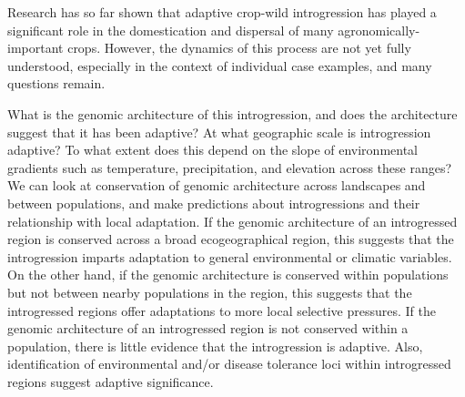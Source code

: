 \documentclass[11pt]{article}
\newcommand{\gmj}[1]{\textcolor{blue}{ \emph{\scriptsize  #1}} } %
\begin{document}


Research has so far shown that adaptive crop-wild introgression has played a significant role in the domestication and dispersal of many agronomically-important crops.
However, the dynamics of this process are not yet fully understood, especially in the context of individual case examples, and many questions remain.

What is the genomic architecture of this introgression, and does the architecture suggest that it has been adaptive?
At what geographic scale is introgression adaptive?
To what extent does this depend on the slope of environmental gradients such as temperature, precipitation, and elevation across these ranges?
We can look at conservation of genomic architecture across landscapes and between populations, and make predictions about introgressions and their relationship with local adaptation.
If the genomic architecture of an introgressed region is conserved across a broad ecogeographical region, this suggests that the introgression imparts adaptation to general environmental or climatic variables.
On the other hand, if the genomic architecture is conserved within populations but not between nearby populations in the region, this suggests that the introgressed regions offer adaptations to more local selective pressures.
If the genomic architecture of an introgressed region is not conserved within a population, there is little evidence that the introgression is adaptive.
Also, identification of environmental and/or disease tolerance loci within introgressed regions suggest adaptive significance.
\end{document}
